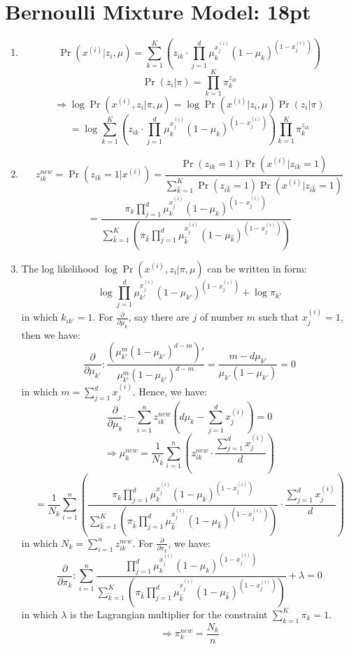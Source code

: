 \documentclass[12pt]{article}
\begin{document}
\section{Bernoulli Mixture Model: 18pt}
\begin{enumerate}
    \item \[\Pr(x^{(i)}|z_i,\mu) = \sum_{k=1}^{K}\left(z_{ik}\cdot\prod_{j=1}^{d}\mu_k^{x_j^{(i)}}(1-\mu_k)^{(1-x_j^{(i)})}\right)\] 
    \[\Pr(z_i|\pi) = \prod_{k=1}^{K}\pi_k^{z_{ik}}\]
    \[\Rightarrow\log\Pr(x^{(i)},z_i|\pi,\mu) = \log\Pr(x^{(i)}|z_i,\mu)\Pr(z_i|\pi)\]
    \[= \log \sum_{k=1}^{K}\left(z_{ik}\cdot\prod_{j=1}^{d}\mu_k^{x_j^{(i)}}(1-\mu_k)^{(1-x_j^{(i)})}\right)\prod_{k=1}^{K}\pi_k^{z_{ik}}\]

    \item \[z_{ik}^{new} = \Pr(z_{ik}=1|x^{(i)}) = \frac{\Pr(z_{ik}=1)\Pr(x^{(i)}|z_{ik}=1)}{\sum_{\hat{k}=1}^{K}\Pr(z_{i\hat{k}}=1)\Pr(x^{(i)}|z_{i\hat{k}}=1)}\]
    \[= \frac{\displaystyle\pi_{k}\prod_{j=1}^{d}\mu_k^{x_j^{(i)}}(1-\mu_k)^{(1-x_j^{(i)})}}{\displaystyle\sum_{\hat{k}=1}^{K}\left(\pi_{\hat{k}}\prod_{j=1}^{d}\mu_{\hat{k}}^{x_j^{(i)}}(1-\mu_{\hat{k}})^{(1-x_j^{(i)})}\right)}\]

    \item The log likelihood $\log\Pr(x^{(i)},z_i|\pi,\mu)$ can be written in form:
    \[\log\prod_{j=1}^{d}\mu_{k'}^{x_j^{(i)}}(1-\mu_{k'})^{(1-x_j^{(i)})} + \log\pi_{k'}\]
    in which $k_{ik'} = 1$. For $\frac{\partial}{\partial\mu_k}$, say there are $j$ of number $m$ such that $x^{(i)}_j = 1$, then we have:
    \[\frac{\partial}{\partial\mu_{k'}}: \frac{\left(\mu_{k'}^{m}(1-\mu_{k'})^{d-m}\right)'}{\mu_{k'}^{m}(1-\mu_{k'})^{d-m}} = \frac{m-d\mu_{k'}}{\mu_{k'}(1-\mu_{k'})} = 0\]
    in which $m = \sum_{j=1}^{d}x_j^{(i)}$.
    \newpage
    Hence, we have:
    \[\frac{\partial}{\partial\mu_k}: -\sum_{i=1}^{n}z_{ik}^{new}\left(d\mu_k - \sum_{j=1}^{d}x_j^{(i)}\right) = 0\]
    \[\Rightarrow \mu_{k}^{new} = \frac{1}{N_k}\sum_{i=1}^{n}\left(z_{ik}^{new}\cdot\frac{\sum_{j=1}^{d}x^{(i)}_{j}}{d}\right)\]
    \[= \frac{1}{N_k}\sum_{i=1}^{n}\left(\frac{\pi_{k}\prod_{j=1}^{d}\mu_k^{x_j^{(i)}}(1-\mu_k)^{(1-x_j^{(i)})}}{\sum_{\hat{k}=1}^{K}\left(\pi_{\hat{k}}\prod_{j=1}^{d}\mu_{\hat{k}}^{x_j^{(i)}}(1-\mu_{\hat{k}})^{(1-x_j^{(i)})}\right)}\cdot\frac{\sum_{j=1}^{d}x^{(i)}_{j}}{d}\right)\]
    in which $N_k = \sum_{i=1}^{n}z_{ik}^{new}$.
    For $\frac{\partial}{\partial\pi_k}$, we have:
    \[\frac{\partial}{\partial\pi_{k}}: \sum_{i=1}^{n}\frac{\prod_{j=1}^{d}\mu_k^{x_j^{(i)}}(1-\mu_k)^{(1-x_j^{(i)})}}{\sum_{\hat{k}=1}^{K}\left(\pi_{\hat{k}}\prod_{j=1}^{d}\mu_{\hat{k}}^{x_j^{(i)}}(1-\mu_{\hat{k}})^{(1-x_j^{(i)})}\right)} + \lambda = 0\]
    in which $\lambda$ is the Lagrangian multiplier for the constraint $\sum_{k=1}^{K}\pi_k = 1$.
    \[\Rightarrow\pi_{k}^{new} = \frac{N_k}{n}\]
\end{enumerate}
\newpage
\end{document}
